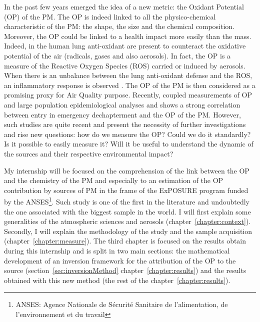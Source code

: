 In the past few years emerged the idea of a new metric: the Oxidant Potential (OP) of the
{PM}. The OP is indeed linked to all the physico-chemical characteristic of the PM: the
shape, the size and the chemical composition.  Moreover, the OP could be linked to a
health impact more easily than the mass.  Indeed, in the human lung anti-oxidant are
present to counteract the oxidative potential of the air (radicals, gases and also
aerosols).  In fact, the OP is a measure of the Reactive Oxygen Species (ROS) carried or
induced by aerosols. When there is an unbalance between the lung anti-oxidant defense and
the ROS, an inflammatory response is observed
\autocite{donaldsonOxidative2003,delfinoPotential2005,liAdjuvant2009}.  The OP of the
PM is then considered as a promising proxy for Air Quality purpose.  Recently,
\textcite{fangOxidative2016} coupled measurements of OP and large population
epidemiological analyses and shows a strong correlation between entry in emergency
dechapterment and the OP of the {PM}.
However, such studies are quite recent and present the necessity of further investigations
and rise new questions: how do we measure the {OP}? Could we do it standardly?  Is it
possible to easily measure it?  Will it be useful to understand the dynamic of the sources
and their respective environmental impact?


My internship will be focused on the comprehension of the link between the OP and the
chemistry of the PM and especially to an estimation of the OP contribution by sources of
{PM} in the frame of the ExPOSURE program funded by the ANSES\footnote{ANSES: Agence
Nationale de Sécurité Sanitaire de l'alimentation, de l'environnement et du travail}.
Such study is one of the first in the literature and undoubtedly the one associated with
the biggest sample in the world.  I will first explain some generalities of the
atmospheric sciences and aerosols (chapter~\ref{chapter:context}). Secondly, I will
explain the methodology of the study and the sample acquisition
(chapter~\ref{chapter:measure}).  The third chapter is focused on the results obtain
during this internship and is split in two main sections: the mathematical development of
an inversion framework for the attribution of the OP to the source
(section~\ref{sec:inversionMethod} chapter~\ref{chapter:results}) and the results obtained
with this new method (the rest of the chapter~\ref{chapter:results}).

